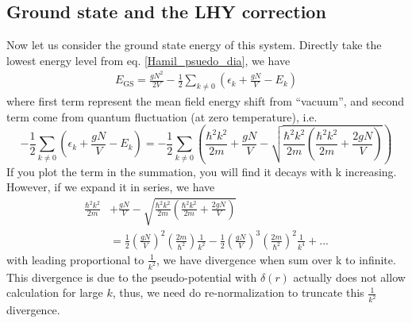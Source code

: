 \subsection{Ground state and the LHY correction}
Now let us consider the ground state energy of this system. Directly take the lowest energy level from eq. \ref{Hamil_psuedo_dia}, we have
\begin{equation}
\begin{split}
E_{\text{GS}}=\frac{g N^2}{2V}-\frac{1}{2}\sum _{k\neq 0} \left(\epsilon _k+\frac{g N}{V}-E_k\right)
\end{split}
\end{equation}
where first term represent the mean field energy shift from {``}vacuum{''}, and second term come from quantum fluctuation (at zero temperature), i.e.
\begin{equation}
-\frac{1}{2}\sum _{k\neq 0} \left(\epsilon _k+\frac{g N}{V}-E_k\right)=-\frac{1}{2}\sum _{k\neq 0} \left(\frac{\hbar ^2k^2}{2m}+\frac{g N}{V}-\sqrt{\frac{\hbar
^2k^2}{2m}\left(\frac{\hbar ^2k^2}{2m}+\frac{2 g N}{V}\right)}\right)
\end{equation}
If you plot the term in the summation, you will find it decays with k increasing. However, if we expand it in series, we have 
\begin{equation}
\begin{split}
\frac{\hbar ^2k^2}{2m}&+\frac{g N}{V}-\sqrt{\frac{\hbar ^2k^2}{2m}\left(\frac{\hbar ^2k^2}{2m}+\frac{2 g N}{V}\right)}\\
&=\frac{1}{2}\left(\frac{gN}{V}\right)^2\left(\frac{2m}{\hbar^2}\right)\frac{1}{k^2}-\frac{1}{2}\left(\frac{gN}{V}\right)^3\left(\frac{2m}{\hbar^2}\right)^2\frac{1}{k^4}+\text{...}
\end{split}
\end{equation}
with leading proportional to $\frac{1}{k^2}$, we have divergence when sum over k to infinite. This divergence is due to the pseudo-potential with $\delta (r)$ actually does not allow calculation for large $k$, thus, we need do re-normalization to truncate this $\frac{1}{k^2}$ divergence.

